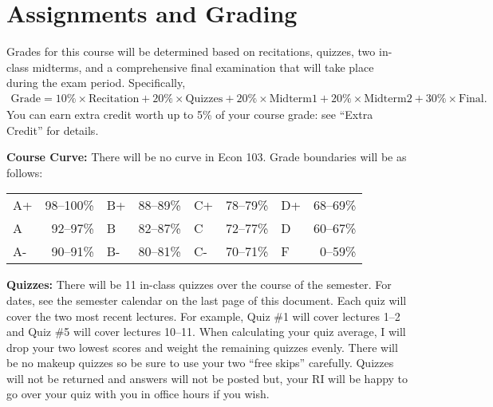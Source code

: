 \documentclass[11pt, letterpaper]{article}
\begin{document}
\section*{Assignments and Grading}

Grades for this course will be determined based on recitations, quizzes, two in-class midterms, and a comprehensive final examination that will take place during the exam period.
Specifically,
	\begin{equation*}
	\begin{split}
    \mbox{Grade} = 10\% \times \mbox{Recitation} + 20\% \times \mbox{Quizzes} + 20\% \times \mbox{Midterm1} + 20\% \times \mbox{Midterm2} + 30\% \times \mbox{Final}.
	\end{split}
	\end{equation*}
You can earn extra credit worth up to 5\% of your course grade: see ``Extra Credit'' for details.

\medskip 

\noindent \textbf{Course Curve:}
There will be no curve in Econ 103.
Grade boundaries will be as follows:
\begin{center}
\begin{tabular}{lr|lr|lr|lr}
  A+ & 98--100\%& B+ & 88--89\% & C+ & 78--79\% & D+ & 68--69\% \\
  A  & 92--97\% & B  & 82--87\% & C  & 72--77\% & D & 60--67\%\\
  A- & 90--91\% & B- & 80--81\% & C- & 70--71\% & F & 0--59\%\\
\end{tabular}
\end{center}

\medskip


\noindent \textbf{Quizzes:} 
There will be 11 in-class quizzes over the course of the semester.
For dates, see the semester calendar on the last page of this document.
Each quiz will cover the two most recent lectures.
For example, Quiz \#1 will cover lectures 1--2 and Quiz \#5 will cover lectures 10--11.
When calculating your quiz average, I will drop your two lowest scores and weight the remaining quizzes evenly. 
There will be no makeup quizzes so be sure to use your two ``free skips'' carefully.
Quizzes will not be returned and answers will not be posted but, your RI will be happy to go over your quiz with you in office hours if you wish. 
\end{document}
